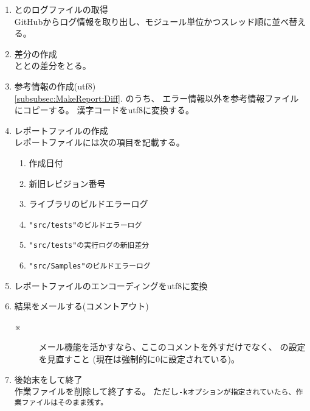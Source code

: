 \begin{Proc}[b]
\begin{enumerate}
  \item	{}とのログファイルの取得\\
	GitHubからログ情報を取り出し、モジュール単位かつスレッド順に並べ替える。\\

  \item	\label{subsubsec:MakeReport:Diff}
	差分の作成\\
	ととの差分をとる。\\

  \item	参考情報の作成(utf8)\\
	\ref{subsubsec:MakeReport:Diff}. のうち、
	エラー情報以外を参考情報ファイルにコピーする。
        漢字コードをutf8に変換する。

  \item	レポートファイルの作成\\
	レポートファイルには次の項目を記載する。
	\begin{narrow}
		\begin{enumerate}
		  \item	作成日付
		  \item	新旧レビジョン番号
		  \item	ライブラリのビルドエラーログ
		  \item	\tt{"src/tests"}のビルドエラーログ
		  \item	\tt{"src/tests"}の実行ログの新旧差分
		  \item	\tt{"src/Samples"}のビルドエラーログ
		\end{enumerate}
	\end{narrow}

  \item	レポートファイルのエンコーディングをutf8に変換

  \item	結果をメールする(コメントアウト)
	\begin{description}
	  \item[※] メール機能を活かすなら、ここのコメントを外すだけでなく、
		    の設定を見直すこと
		    (現在は強制的に0に設定されている)。
	\end{description}

  \item	後始末をして終了\\
	作業ファイルを削除して終了する。
	ただし\tt{-k}オプションが指定されていたら、作業ファイルはそのまま残す。

\end{enumerate}
\end{Proc}
